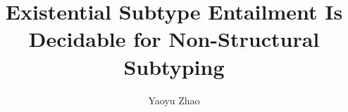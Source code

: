 \documentclass[acmsmall,screen,review,anonymous,nonacm]{acmart}
\begin{document}
\title{Existential Subtype Entailment Is Decidable for Non-Structural Subtyping}
\author{Yaoyu Zhao}
\begin{abstract}

\end{abstract}
\maketitle



















\appendix
{}









\end{document}
